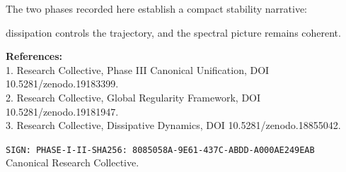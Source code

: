 ﻿\documentclass[11pt,a4paper]{amsart}
\begin{document}
The two phases recorded here establish a compact stability narrative:

dissipation controls the trajectory, and the spectral picture remains coherent.



\bigskip

\noindent\textbf{References:}\\

1. Research Collective, Phase III Canonical Unification, DOI 10.5281/zenodo.19183399.\\

2. Research Collective, Global Regularity Framework, DOI 10.5281/zenodo.19181947.\\

3. Research Collective, Dissipative Dynamics, DOI 10.5281/zenodo.18855042.



\medskip

\noindent \texttt{SIGN: PHASE-I-II-SHA256: 8085058A-9E61-437C-ABDD-A000AE249EAB}\\

 Canonical Research Collective.
\end{document}
